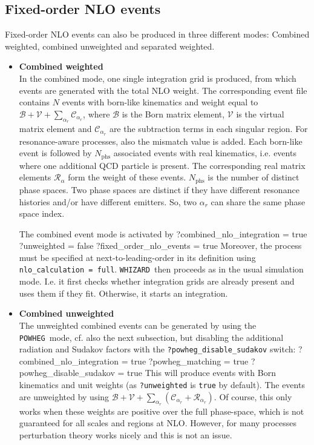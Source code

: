 \documentclass[12pt]{book}
\newenvironment{code}%
  {\begingroup\footnotesize
   \quote
   \Verbatim}%
  {\endVerbatim
   \endquote
   \endgroup\noindent}
\newcommand{\ttt}[1]{\texttt{#1}}
\newcommand{\whizard}{\ttt{WHIZARD}}
\newcommand{\powheg}{\ttt{POWHEG}}
\begin{document}
\subsection{Fixed-order NLO events}
\label{ss:fixedorderNLOevents}
Fixed-order NLO events can also be produced in three different modes:
Combined weighted, combined unweighted and separated weighted.
\begin{itemize}
  \item \textbf{Combined weighted}\\
    In the combined mode, one single integration grid is produced, from
    which events are generated with the total NLO weight. The
    corresponding event file contains $N$ events with born-like
    kinematics and weight equal to $\mathcal{B} + \mathcal{V} +
    \sum_{\alpha_r} \mathcal{C}_{\alpha_r}$, where $\mathcal{B}$ is the
    Born matrix element, $\mathcal{V}$ is the virtual matrix element and
    $\mathcal{C}_{\alpha_r}$ are the subtraction terms in each singular
    region. For resonance-aware processes, also the mismatch value is
    added. Each born-like event is followed by $N_{\text{phs}}$
    associated events with real kinematics, i.e. events where one
    additional QCD particle is present. The corresponding real
    matrix elements $\mathcal{R}_\alpha$ form the weight of these events.
    $N_{\text{phs}}$ is the number of distinct phase spaces. Two phase spaces
    are distinct if they have different resonance histories and/or have
    different emitters. So, two $\alpha_r$ can share the same phase
    space index.

    The combined event mode is activated by
    \begin{code}
      ?combined_nlo_integration = true
      ?unweighted = false
      ?fixed_order_nlo_events = true
    \end{code}
    Moreover, the process must be specified at next-to-leading-order in its
    definition using \ttt{nlo\_calculation = full}.  \whizard\ then
    proceeds as in the usual simulation mode. I.e. it first checks
    whether integration grids are already present and uses them if they
    fit. Otherwise, it starts an integration.
  \item \textbf{Combined unweighted}\\
    The unweighted combined events can be generated by using the
    \powheg\ mode, cf. also the next subsection, but disabling the
    additional radiation and Sudakov factors with the
    \ttt{?powheg\_disable\_sudakov} switch:
    \begin{code}
      ?combined_nlo_integration = true
      ?powheg_matching = true
      ?powheg_disable_sudakov = true
    \end{code}
    This will produce events with Born kinematics and unit weights (as
    \ttt{?unweighted} is \ttt{true} by default).  The events are
    unweighted by using $\mathcal{B} + \mathcal{V} + \sum_{\alpha_r}
    (\mathcal{C}_{\alpha_r} + \mathcal{R}_{\alpha_r})$.  Of course, this
    only works when these weights are positive over the full
    phase-space, which is not guaranteed for all scales and regions at
    NLO.  However, for many processes perturbation theory works nicely
    and this is not an issue.


\end{itemize}
\end{document}
